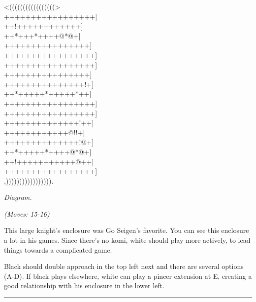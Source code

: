\documentclass[letterpaper,12pt]{memoir}
\newcounter{GoFigure}[part]
\newcommand{\gofigure}{%
 \stepcounter{GoFigure}
 \centerline{\textit{Diagram.\thinspace\arabic{GoFigure}}}
}
\newcommand{\subtext}[1]{\centerline{\textit{#1}}}
\begin{document}
\begin{minipage}[t]{240pt}
\label{Fujisawa-Hosai-vs-Go-Seigen-19430225:mainmove-15}
{\gnos
<(((((((((((((((((>\\
+++++++++++++++++]\\
++!++++++++++++]\\
++*+++*++++@*@+]\\
++++++++++++++++]\\
+++++++++++++++++]\\
+++++++++++++++++]\\
++++++++++++++++]\\
+++++++++++++++!+]\\
++*+++++*+++++*++]\\
+++++++++++++++++]\\
+++++++++++++++++]\\
++++++++++++++!++]\\
++++++++++++@!!+]\\
++++++++++++++!@+]\\
++*+++++*++++@*@+]\\
++!+++++++++++@++]\\
+++++++++++++++++]\\
,))))))))))))))))).\\
}
\gofigure
\subtext{(Moves: 15-16)}
\end{minipage}
\begin{minipage}[t]{268.19999999999993pt}
\setlength{\parskip}{0.5em}
This large knight's enclosure was Go Seigen's favorite. You can see this enclosure a lot in his games. Since there's no komi, white should play more actively, to lead things towards a complicated game.

Black should double approach in the top left next and there are several options (A-D). If black plays elsewhere, white can play a pincer extension at E, creating a good relationship with his enclosure in the lower left.


\end{minipage}
\vfill

\rule{\textwidth}{0.5pt}
\end{document}
